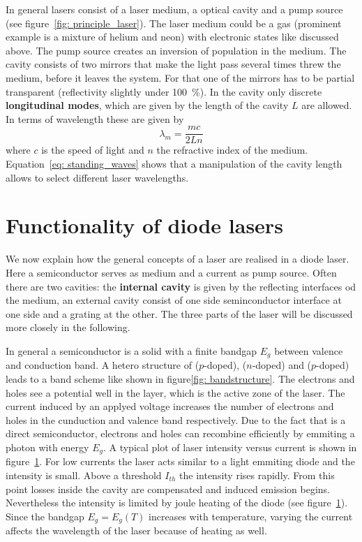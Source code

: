 In general lasers consist of a laser medium, a optical cavity and a pump source (see figure~\ref{fig: principle_laser}).
The laser medium could be a gas (prominent example is a mixture of helium and neon) with electronic states like discussed above. The pump source
creates an inversion of population in the medium. The cavity consists of two mirrors that make the light pass several times threw the medium, before
it leaves the system. For that one of the mirrors has to be partial transparent (reflectivity slightly under \SI{100}{\percent}). In the
cavity only discrete \textbf{longitudinal modes}, which are given by the length of the cavity $L$ are allowed. In terms of wavelength these are
given by
\begin{equation}
  \lambda_m = \frac{m c}{2 L n}
  \label{eq: standing_waves}
\end{equation}
where $c$ is the speed of light and $n$ the refractive index of the medium. Equation~\eqref{eq: standing_waves} shows that a manipulation of the
cavity length allows to select different laser wavelengths.

\section{Functionality of diode lasers}
We now explain how the general concepts of a laser are realised in a diode laser. Here a semiconductor serves as medium and a current as pump source.
Often there are two cavities: the \textbf{internal cavity} is given by the reflecting interfaces od the medium, an external cavity consist of
one side seminconductor interface at one side and a grating at the other. The three parts of the laser will be discussed more closely in the following.

In general a semiconductor is a solid with a finite bandgap $E_g$ between valence and conduction band. A hetero structure of  ($p$-doped),
 ($n$-doped)
and  ($p$-doped) leads to a band scheme like shown in figure\ref{fig: bandstructure}. The electrons and holes see a potential well
in the  layer, which is the active zone of the laser. The current induced by an applyed voltage increases the number of electrons
and holes in the cunduction and valence band respectively. Due to the fact that  is a direct semiconductor, electrons and holes can
recombine efficiently by emmiting a photon with energy $E_g$. A typical plot of laser intensity versus current is shown in figure~\ref{}. For low
currents the laser acts similar to a light emmiting diode and the intensity is small. Above a threshold $I_{th}$ the intensity rises rapidly.
From this point losses inside the cavity are compensated and induced emission begins. Nevertheless the intensity is limited by joule heating
of the diode (see figure~\ref{}). Since the bandgap $E_g = E_g(T)$ increases with temperature, varying the current affects
the wavelength of the laser because of heating as well.

